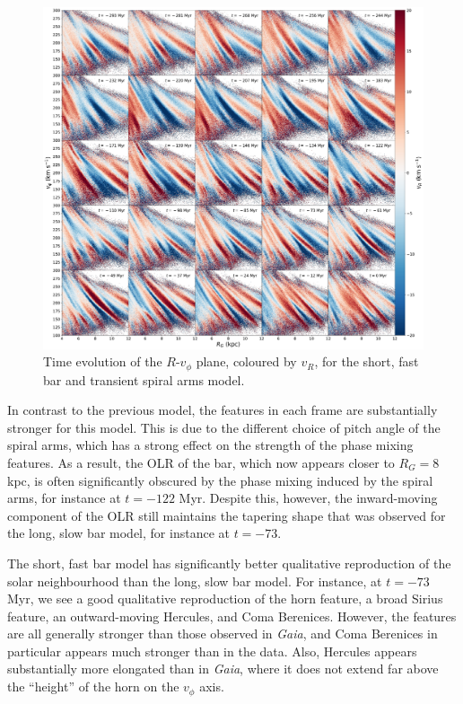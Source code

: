 \documentclass[10pt]{article}
\begin{document}
\begin{figure}[h]
    \centering
    \includegraphics[width=\textwidth]{plots/sfb_spiral_RvT_vR.pdf}
    \caption{Time evolution of the $R$-$v_\phi$ plane, coloured by $v_R$, for the short, fast bar and transient spiral arms model.}
    \label{fig:sfb}
\end{figure}

In contrast to the previous model, the features in each frame are substantially stronger for this model. This is due to the different choice of pitch angle of the spiral arms, which has a strong effect on the strength of the phase mixing features. As a result, the OLR of the bar, which now appears closer to $R_G = 8$ kpc, is often significantly obscured by the phase mixing induced by the spiral arms, for instance at $t = -122$ Myr. Despite this, however, the inward-moving component of the OLR still maintains the tapering shape that was observed for the long, slow bar model, for instance at $t = -73$. 

The short, fast bar model has significantly better qualitative reproduction of the solar neighbourhood than the long, slow bar model. For instance, at $t = -73$ Myr, we see a good qualitative reproduction of the horn feature, a broad Sirius feature, an outward-moving Hercules, and Coma  Berenices. However, the features are all generally stronger than those observed in \textit{Gaia}, and Coma Berenices in particular appears much stronger than in the data. Also, Hercules appears substantially more elongated than in \textit{Gaia}, where it does not extend far above the ``height'' of the horn on the $v_\phi$ axis.
\end{document}
